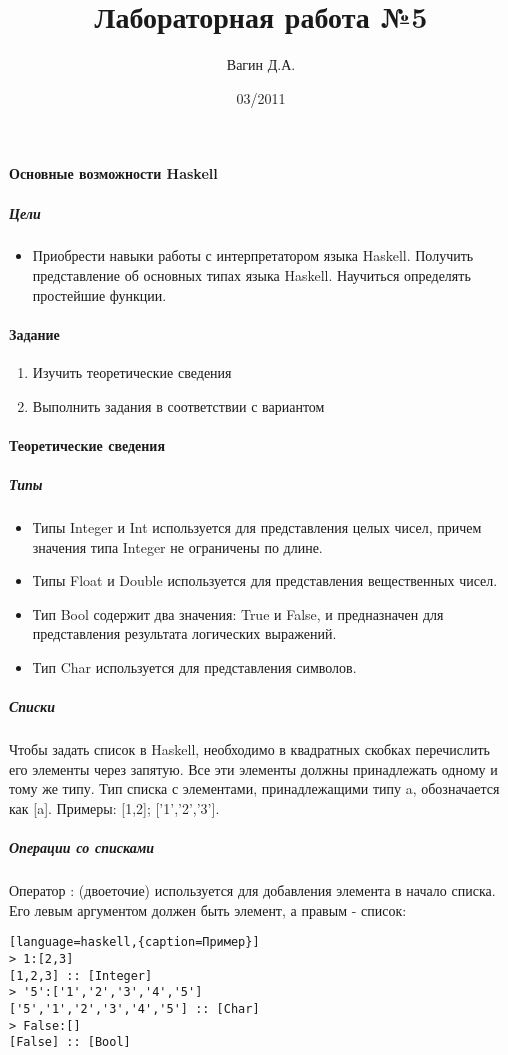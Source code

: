 \documentclass[a4paper,12pt]{article}
\title{Лабораторная работа №5}
\author{Вагин Д.А.}
\date{03/2011}
\begin{document}

\paragraph{Основные возможности Haskell}
\subparagraph{Цели}
\begin{itemize}
	\item Приобрести навыки работы с интерпретатором языка Haskell. Получить представление об основных типах языка Haskell. Научиться определять простейшие функции.
\end{itemize}

\paragraph{Задание}
\begin{enumerate}
	\item Изучить теоретические сведения
	\item Выполнить задания в соответствии с вариантом
\end{enumerate}

\paragraph{Теоретические сведения}
\subparagraph{Типы}
\begin{itemize}
	\item Типы Integer и Int используется для представления целых чисел, причем значения типа Integer не ограничены по длине.
	\item Типы Float и Double используется для представления вещественных чисел.
	\item Тип Bool содержит два значения: True и False, и предназначен для представления результата логических выражений.
	\item  Тип Char используется для представления символов.
\end{itemize}

\subparagraph{Списки}
Чтобы задать список в Haskell, необходимо в квадратных скобках перечислить его элементы через запятую. Все эти элементы должны принадлежать одному и тому же типу. Тип списка с элементами, принадлежащими типу a, обозначается как [a]. Примеры: [1,2]; ['1','2','3'].

\subparagraph{Операции со списками}
Оператор : (двоеточие) используется для добавления элемента в начало списка. Его левым аргументом должен быть элемент, а правым - список:
\begin{lstlisting}[language=haskell,{caption=Пример}]
> 1:[2,3]
[1,2,3] :: [Integer]
> '5':['1','2','3','4','5']
['5','1','2','3','4','5'] :: [Char]
> False:[]
[False] :: [Bool]
\end{lstlisting}
\end{document}
